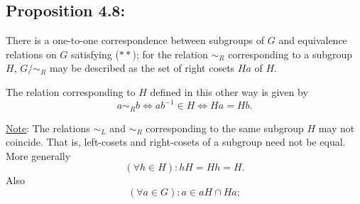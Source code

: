 \subsection*{Proposition 4.8:}
There is a one-to-one correspondence between subgroups of $G$ and equivalence relations on $G$ satisfying ($**$); for the relation $\sim_R$ corresponding to a subgroup $H$, $G/{\sim_R}$ may be described as the set of right cosets $Ha$ of $H$.

\vspace{1em}

\noindent The relation corresponding to $H$ defined in this other way is given by
$$a \sim_R b \iff ab^{-1} \in H \iff Ha = Hb.$$

\noindent\underline{Note}: The relations $\sim_L$ and $\sim_R$ corresponding to the same subgroup $H$ may not coincide. That is, left-cosets and right-cosets of a subgroup need not be equal. More generally
$$(\forall h \in H) : hH = Hh = H.$$
Also
$$(\forall a \in G) : a \in aH \cap Ha;$$

\vspace{1em}

